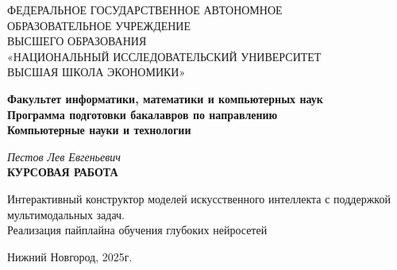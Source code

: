 \documentclass[14pt]{extarticle}
\begin{document}
\begin{titlepage}
\begin{center}
\normalsize
\normalsize{ФЕДЕРАЛЬНОЕ ГОСУДАРСТВЕННОЕ АВТОНОМНОЕ\\ОБРАЗОВАТЕЛЬНОЕ УЧРЕЖДЕНИЕ\\ВЫСШЕГО ОБРАЗОВАНИЯ\\«НАЦИОНАЛЬНЫЙ ИССЛЕДОВАТЕЛЬСКИЙ УНИВЕРСИТЕТ\\

ВЫСШАЯ ШКОЛА ЭКОНОМИКИ»}

\vfill

\textbf{Факультет информатики, математики и компьютерных наук}\\[3mm]

\textbf{Программа подготовки бакалавров по направлению\\Компьютерные науки и технологии}

\vfill

\textit{Пестов Лев Евгеньевич}\\[3mm]

\textbf{КУРСОВАЯ РАБОТА}\\[10mm]

\normalsize{ 
 	
Интерактивный конструктор моделей искусственного интеллекта с поддержкой мультимодальных задач. \\Реализация пайплайна обучения глубоких нейросетей}

\end{center}

\vfill
\newlength{\ML}
\hfill
\begin{minipage}{0.4\textwidth}
\end{minipage}%
\vfill
\begin{center}

Нижний Новгород, 2025г.

\end{center}
\end{titlepage}
\newpage  

\renewcommand{\contentsname}{Структура работы}
\tableofcontents
\newpage
\end{document}
